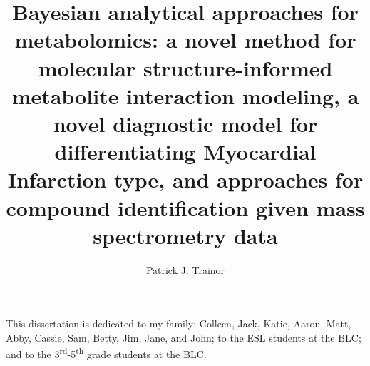 \documentclass[final]{ulthesis}
\begin{document}
\author{Patrick J. Trainor}


\title{Bayesian analytical approaches for metabolomics: a novel method for molecular structure-informed metabolite interaction modeling, a novel diagnostic model for differentiating Myocardial Infarction type, and  approaches for compound identification given mass spectrometry data}









\frontmatter

\maketitle

\begin{dedication}
This dissertation is dedicated to my family: Colleen, Jack, Katie, Aaron, Matt, Abby, Cassie, Sam, Betty, Jim, Jane, and John; to the ESL students at the BLC; and to the 3\textsuperscript{rd}-5\textsuperscript{th} grade students at the BLC.
\end{dedication}
\end{document}
